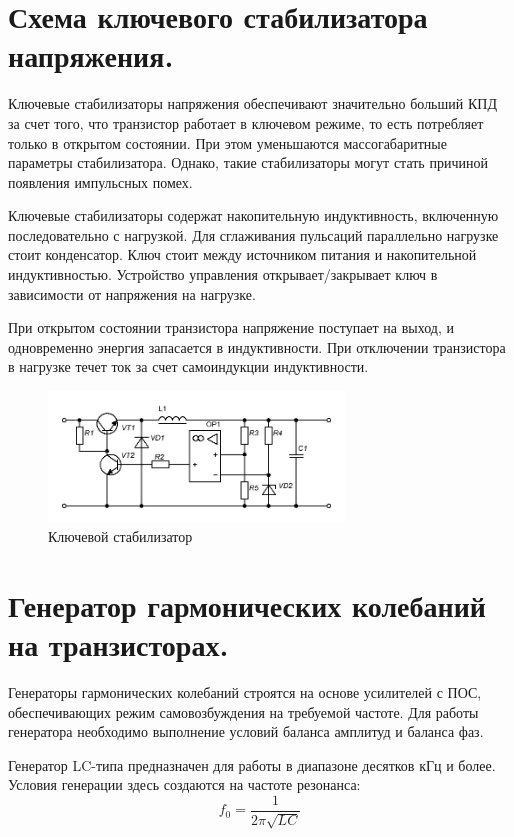 \documentclass[unicode, 12pt, a4paper, oneside]{article}
\begin{document}
\section{Схема ключевого стабилизатора напряжения.}

Ключевые стабилизаторы напряжения обеспечивают значительно больший КПД за счет того, что транзистор работает в ключевом режиме, то есть потребляет только в открытом состоянии. При этом уменьшаются массогабаритные параметры стабилизатора. Однако, такие стабилизаторы могут стать причиной появления импульсных помех.

Ключевые стабилизаторы содержат накопительную индуктивность, включенную последовательно с нагрузкой. Для сглаживания пульсаций параллельно нагрузке стоит конденсатор. Ключ стоит между источником питания и накопительной индуктивностью. Устройство управления открывает/закрывает ключ в зависимости от напряжения на нагрузке.

При открытом состоянии транзистора напряжение поступает на выход, и одновременно энергия запасается в индуктивности. При отключении транзистора в нагрузке течет ток за счет самоиндукции индуктивности.

\begin{figure}[H]
\centering
\includegraphics[width=0.7\textwidth]{149.jpg}
\caption{Ключевой стабилизатор}
\end{figure}

\section{Генератор гармонических колебаний на транзисторах.}

Генераторы гармонических колебаний строятся на основе усилителей с ПОС, обеспечивающих режим самовозбуждения на требуемой частоте. Для работы генератора необходимо выполнение условий баланса амплитуд и баланса фаз.

Генератор LC-типа предназначен для работы в диапазоне десятков кГц и более. Условия генерации здесь создаются на частоте резонанса:
\begin{displaymath}
f_0 = \frac{1}{2 \pi \sqrt{L C}}
\end{displaymath}
\end{document}
